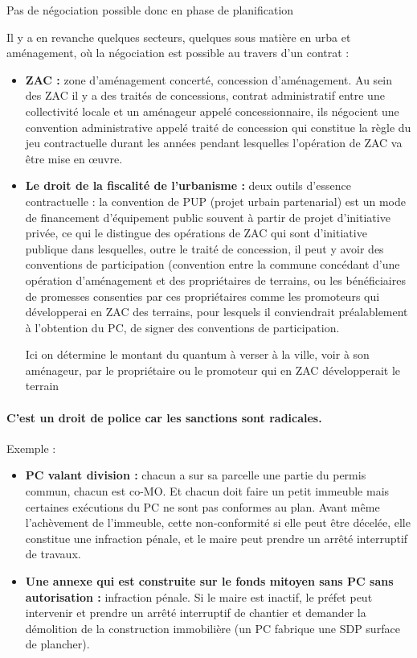 		Pas de négociation possible donc en phase de planification


		Il y a en revanche quelques secteurs, quelques sous matière en urba et aménagement, où la négociation est possible au travers d’un contrat :

		\begin{itemize}
			\item \textbf{ZAC :} zone d’aménagement concerté, concession d’aménagement. Au sein des ZAC il y a des traités de concessions, contrat administratif entre une collectivité locale et un aménageur appelé concessionnaire, ils négocient une convention administrative appelé traité de concession qui constitue la règle du jeu contractuelle durant les années pendant lesquelles l’opération de ZAC va être mise en œuvre.

			\item \textbf{Le droit de la fiscalité de l’urbanisme :} deux outils d’essence contractuelle : la convention de PUP (projet urbain partenarial) est un mode de financement d’équipement public souvent à partir de projet d’initiative privée, ce qui le distingue des opérations de ZAC qui sont d’initiative publique dans lesquelles, outre le traité de concession, il peut y avoir des conventions de participation (convention entre la commune concédant d’une opération d’aménagement et des propriétaires de terrains, ou les bénéficiaires de promesses consenties par ces propriétaires comme les promoteurs qui développerai en ZAC des terrains, pour lesquels il conviendrait préalablement à l’obtention du PC, de signer des conventions de participation.

			Ici on détermine le montant du quantum à verser à la ville, voir à son aménageur, par le propriétaire ou le promoteur qui en ZAC développerait le terrain
		\end{itemize}


		\paragraph{C’est un droit de police car les sanctions sont radicales.}
		Exemple :

		\begin{itemize}
			\item \textbf{PC valant division :} chacun a sur sa parcelle une partie du permis commun, chacun est co-MO. Et chacun doit faire un petit immeuble mais certaines exécutions du PC ne sont pas conformes au plan. Avant même l’achèvement de l’immeuble, cette non-conformité si elle peut être décelée, elle constitue une infraction pénale, et le maire peut prendre un arrêté interruptif de travaux.
			\item \textbf{Une annexe qui est construite sur le fonds mitoyen sans PC sans autorisation :} infraction pénale. Si le maire est inactif, le préfet peut intervenir et prendre un arrêté interruptif de chantier et demander la démolition de la construction immobilière (un PC fabrique une SDP surface de plancher).
		\end{itemize}


